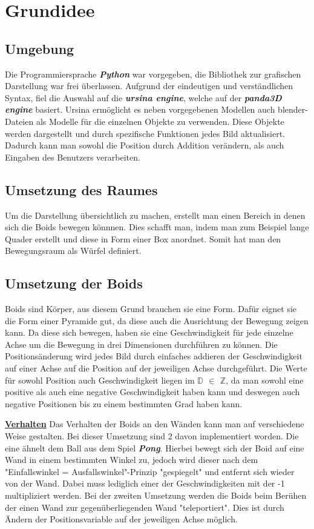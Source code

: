 \documentclass[a4paper, 12pt]{article}
\begin{document}
	\section{Grundidee}
	\subsection{Umgebung}
		Die Programmiersprache \emph{\textbf{Python}} war vorgegeben, die Bibliothek zur grafischen Darstellung war frei überlassen. Aufgrund der eindeutigen und verständlichen Syntax, fiel die Auswahl auf die \emph{\textbf{ursina engine}}, welche auf der \emph{\textbf{panda3D engine}} basiert. Ursina ermöglicht es neben vorgegebenen Modellen auch blender-Dateien als Modelle für die einzelnen Objekte zu verwenden. Diese Objekte werden dargestellt und durch spezifische Funktionen jedes Bild aktualisiert. Dadurch kann man sowohl die Position durch Addition verändern, als auch Eingaben des Benutzers verarbeiten. 
	
	\subsection{Umsetzung des Raumes}
		Um die Darstellung übersichtlich zu machen, erstellt man einen Bereich in denen sich die Boids bewegen könnnen. Dies schafft man, indem man zum Beispiel lange Quader erstellt und diese in Form einer Box anordnet. Somit hat man den Bewegungsraum als Würfel definiert.
		
	\subsection{Umsetzung der Boids}
		Boids sind Körper, aus diesem Grund brauchen sie eine Form. Dafür eignet sie die Form einer Pyramide gut, da diese auch die Ausrichtung der Bewegung zeigen kann. Da diese sich bewegen, haben sie eine Geschwindigkeit für jede einzelne Achse um die Bewegung in drei Dimensionen durchführen zu können. Die Positionsänderung wird jedes Bild durch einfaches addieren der Geschwindigkeit auf einer Achse auf die Position auf der jeweiligen Achse durchgeführt. Die Werte für sowohl Position auch Geschwindigkeit liegen im \textbf{$\mathbb{D}$ $\in$ $\mathbb{Z}$}, da man sowohl eine positive als auch eine negative Geschwindigkeit haben kann und deswegen auch negative Positionen bis zu einem bestimmten Grad haben kann.\linebreak
		
		\textbf{\underline{Verhalten}}
		Das Verhalten der Boids an den Wänden kann man auf verschiedene Weise gestalten. Bei dieser Umsetzung sind 2 davon implementiert worden. Die eine ähnelt dem Ball aus dem Spiel \emph{\textbf{Pong}}. Hierbei bewegt sich der Boid auf eine Wand in einem bestimmten Winkel zu, jedoch wird dieser nach dem "Einfallswinkel = Ausfallswinkel"-Prinzip "gespiegelt" und entfernt sich wieder von der Wand. Dabei muss lediglich einer der Geschwindigkeiten mit der -1 multipliziert werden. Bei der zweiten Umsetzung werden die Boids beim Berühen der einen Wand zur gegenüberliegenden Wand "teleportiert". Dies ist durch Ändern der Positionsvariable auf der jeweiligen Achse möglich.\linebreak
		
\end{document}
